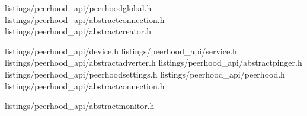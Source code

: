 
\lstset{
	language=C++,
	basicstyle=\small\ttfamily,
	breaklines=true
}


\ApplyAppendixFirstPageStyle{}

	{listings/peerhood_api/peerhoodglobal.h}
	{listings/peerhood_api/abstractconnection.h}
	{listings/peerhood_api/abstractcreator.h}

\ApplyAppendixPageStyle{}

	{listings/peerhood_api/device.h}
	{listings/peerhood_api/service.h}
	{listings/peerhood_api/abstractadverter.h}
	{listings/peerhood_api/abstractpinger.h}
	{listings/peerhood_api/peerhoodsettings.h}
	{listings/peerhood_api/peerhood.h}
	{listings/peerhood_api/abstractconnection.h}

\ApplyAppendixLastPageStyle{}

	{listings/peerhood_api/abstractmonitor.h}